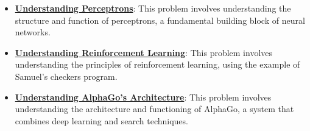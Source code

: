 \documentclass{article}%
\begin{document}
\begin{itemize}[leftmargin=*]
\item \href{\url{https://purdue.brightspace.com/d2l/common/assets/pdfjs-d2l-dist/1.0.14-legacy/web/viewer.html?file=\%252Fcontent\%252Fenforced\%252F1095467-wl.202510.CS.24300.001\%252F02L2-Intro.pdf\%253Fou\%253D1095467\&lang=en-us\&container=d2l-fileviewer-rendered-pdf\&fullscreen=d2l-fileviewer-rendered-pdf-dialog\&height=667}#page=45}{\textbf{Understanding Perceptrons}}: This problem involves understanding the structure and function of perceptrons, a fundamental building block of neural networks.%
\item \href{\url{https://purdue.brightspace.com/d2l/common/assets/pdfjs-d2l-dist/1.0.14-legacy/web/viewer.html?file=\%252Fcontent\%252Fenforced\%252F1095467-wl.202510.CS.24300.001\%252F02L2-Intro.pdf\%253Fou\%253D1095467\&lang=en-us\&container=d2l-fileviewer-rendered-pdf\&fullscreen=d2l-fileviewer-rendered-pdf-dialog\&height=667}#page=46}{\textbf{Understanding Reinforcement Learning}}: This problem involves understanding the principles of reinforcement learning, using the example of Samuel's checkers program.%
\item \href{\url{https://purdue.brightspace.com/d2l/common/assets/pdfjs-d2l-dist/1.0.14-legacy/web/viewer.html?file=\%252Fcontent\%252Fenforced\%252F1095467-wl.202510.CS.24300.001\%252F02L2-Intro.pdf\%253Fou\%253D1095467\&lang=en-us\&container=d2l-fileviewer-rendered-pdf\&fullscreen=d2l-fileviewer-rendered-pdf-dialog\&height=667}#page=50}{\textbf{Understanding AlphaGo's Architecture}}: This problem involves understanding the architecture and functioning of AlphaGo, a system that combines deep learning and search techniques.%
\end{itemize}%
\end{document}
